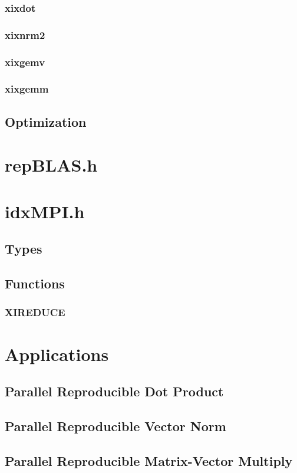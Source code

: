 \documentclass[12pt]{article}
\theoremstyle{plain}
\begin{document}
    \subsubsection{xixdot}
    \subsubsection{xixnrm2}
    \subsubsection{xixgemv}
    \subsubsection{xixgemm}
  \subsection{Optimization}
\section{repBLAS.h}
\section{idxMPI.h}
  \subsection{Types}
  \subsection{Functions}
    \subsubsection{XIREDUCE}
\section{Applications}
  \subsection{Parallel Reproducible Dot Product}
  \subsection{Parallel Reproducible Vector Norm}
  \subsection{Parallel Reproducible Matrix-Vector Multiply}
\end{document}
